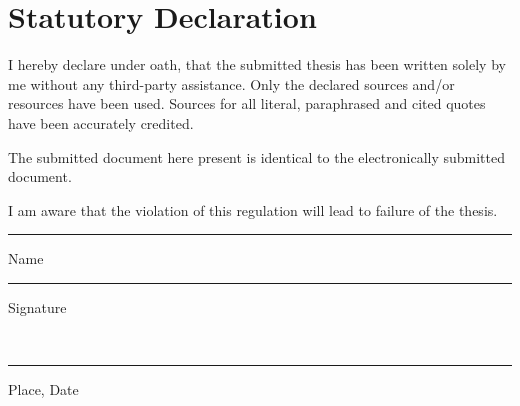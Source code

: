 \newpage
\section*{Statutory Declaration}

I hereby declare under oath, that the submitted thesis has been written solely by me without any third-party assistance. Only the declared sources and/or resources have been used.
Sources for all literal, paraphrased and cited quotes have been accurately credited.

The submitted document here present is identical to the electronically submitted document.

I am aware that the violation of this regulation will lead to failure of the thesis.

\vspace{2.5cm}
\parbox{4cm}{\hrule
\strut \footnotesize Name} \hfill\parbox{4cm}{\hrule
\strut \footnotesize Signature}\\[2cm]

\parbox{4cm}{\hrule
	\strut \footnotesize Place, Date}
